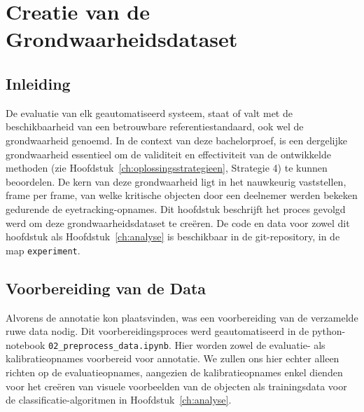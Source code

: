 \chapter{Creatie van de Grondwaarheidsdataset}
\label{ch:grondwaarheid}

\section{Inleiding}

De evaluatie van elk geautomatiseerd systeem, staat of valt met de beschikbaarheid 
van een betrouwbare referentiestandaard, ook wel de grondwaarheid genoemd.
In de context van deze bachelorproef, is een dergelijke grondwaarheid essentieel om de validiteit en effectiviteit 
van de ontwikkelde methoden (zie Hoofdstuk~\ref{ch:oplossingsstrategieen}, Strategie 4) te kunnen beoordelen.
De kern van deze grondwaarheid ligt in het nauwkeurig vaststellen, frame per frame, van welke kritische objecten 
door een deelnemer werden bekeken gedurende de eyetracking-opnames.
Dit hoofdstuk beschrijft het proces gevolgd werd om deze grondwaarheidsdataset te creëren.
De code en data voor zowel dit hoofdstuk als Hoofdstuk~\ref{ch:analyse} is beschikbaar in de git-repository,
in de map \texttt{experiment}.

\section{Voorbereiding van de Data}

Alvorens de annotatie kon plaatsvinden, was een voorbereiding van de verzamelde ruwe data nodig.
Dit voorbereidingsproces werd geautomatiseerd in de python-notebook \texttt{02\_preprocess\_data.ipynb}.
Hier worden zowel de evaluatie- als kalibratieopnames voorbereid voor annotatie. 
We zullen ons hier echter alleen richten op de evaluatieopnames,
aangezien de kalibratieopnames enkel dienden voor het creëren van visuele voorbeelden van de objecten
als trainingsdata voor de classificatie-algoritmen in Hoofdstuk~\ref{ch:analyse}.

